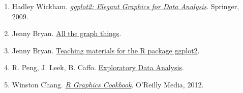 \documentclass[11pt, oneside]{report}
\begin{document}
\begin{enumerate}[(1)]
\item Hadley Wickham. \href{http://www.amazon.com/ggplot2-Elegant-Graphics-Data-Analysis/dp/0387981403/ref=sr_1_2?ie=UTF8&qid=1461133380&sr=8-2&keywords=ggplot2}{\emph{ggplot2: Elegant Graphics for Data Analysis}}. Springer, 2009.
\item Jenny Bryan. \href{http://stat545.com/graph00_index.html}{All the graph things}.
\item Jenny Bryan. \href{https://github.com/jennybc/ggplot2-tutorial}{Teaching materials for the R package ggplot2}.
\item R. Peng, J. Leek, B. Caffo. \href{https://www.coursera.org/learn/exploratory-data-analysis/}{Exploratory Data Analysis}.
\item Winston Chang. \href{http://www.amazon.com/R-Graphics-Cookbook-Winston-Chang/dp/1449316956/ref=sr_1_3?ie=UTF8&qid=1461135767&sr=8-3&keywords=ggplot2}{\emph{R Graphics Cookbook}}. O'Reilly Media, 2012.
\end{enumerate}

%
%

\newpage

\thispagestyle{empty}
\pagecolor{Olive}\afterpage{\nopagecolor}

\null
\vfill
\end{document}
